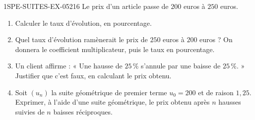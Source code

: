 \begin{exercice}{1SPE-SUITES-EX-052}{1}{6}
Le prix d'un article passe de $200$ euros à $250$ euros.
\begin{enumerate}
\item Calculer le taux d'évolution, en pourcentage.
\item Quel taux d'évolution ramènerait le prix de $250$ euros à $200$ euros ?
  On donnera le coefficient multiplicateur, puis le taux en pourcentage.
\item Un client affirme : « Une hausse de $25\,\%$ s'annule par une baisse de
  $25\,\%$. » Justifier que c'est faux, en calculant le prix obtenu.
\item Soit $(u_n)$ la suite géométrique de premier terme $u_0 = 200$ et de
  raison $1{,}25$. Exprimer, à l'aide d'une suite géométrique, le prix obtenu
  après $n$ hausses suivies de $n$ baisses réciproques.
\end{enumerate}
\end{exercice}
